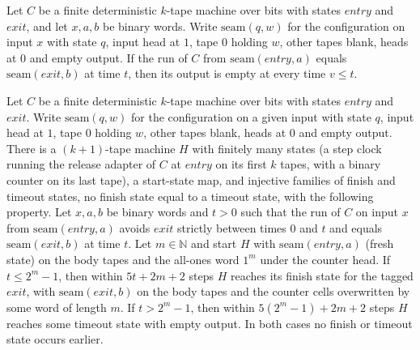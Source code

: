 \begin{theorem}
\label{Turing.NTimeDiag.qy_call_output_nil}
\leanok
{}
Let $C$ be a finite deterministic $k$-tape machine over bits with states $\mathit{entry}$ and
$\mathit{exit}$, and let $x, a, b$ be binary words. Write $\mathrm{seam}(q, w)$ for the
configuration on input $x$ with state $q$, input head at $1$, tape $0$ holding $w$, other tapes
blank, heads at $0$ and empty output. If the run of $C$ from $\mathrm{seam}(\mathit{entry}, a)$
equals $\mathrm{seam}(\mathit{exit}, b)$ at time $t$, then its output is empty at every time
$v \le t$.
\end{theorem}

\begin{theorem}
\label{Turing.NTimeDiag.qy_clocked_call}
\leanok
{}
Let $C$ be a finite deterministic $k$-tape machine over bits with states $\mathit{entry}$ and
$\mathit{exit}$. Write $\mathrm{seam}(q, w)$ for the configuration on a given input with state
$q$, input head at $1$, tape $0$ holding $w$, other tapes blank, heads at $0$ and empty output.
There is a $(k+1)$-tape machine $H$ with finitely many states (a step clock running the release
adapter of $C$ at $\mathit{entry}$ on its first $k$ tapes, with a binary counter on its last tape),
a start-state map, and injective families of finish and timeout states, no finish state equal to
a timeout state, with the following property. Let $x, a, b$ be binary words and $t > 0$ such that
the run of $C$ on input $x$ from $\mathrm{seam}(\mathit{entry}, a)$ avoids $\mathit{exit}$
strictly between times $0$ and $t$ and equals $\mathrm{seam}(\mathit{exit}, b)$ at time $t$. Let
$m \in \mathbb{N}$ and start $H$ with $\mathrm{seam}(\mathit{entry}, a)$ (fresh state) on the body
tapes and the all-ones word $1^m$ under the counter head. If $t \le 2^m - 1$, then within
$5t + 2m + 2$ steps $H$ reaches its finish state for the tagged $\mathit{exit}$, with
$\mathrm{seam}(\mathit{exit}, b)$ on the body tapes and the counter cells overwritten by some
word of length $m$. If $t > 2^m - 1$, then within $5(2^m - 1) + 2m + 2$ steps $H$ reaches some
timeout state with empty output. In both cases no finish or timeout state occurs earlier.
\end{theorem}

